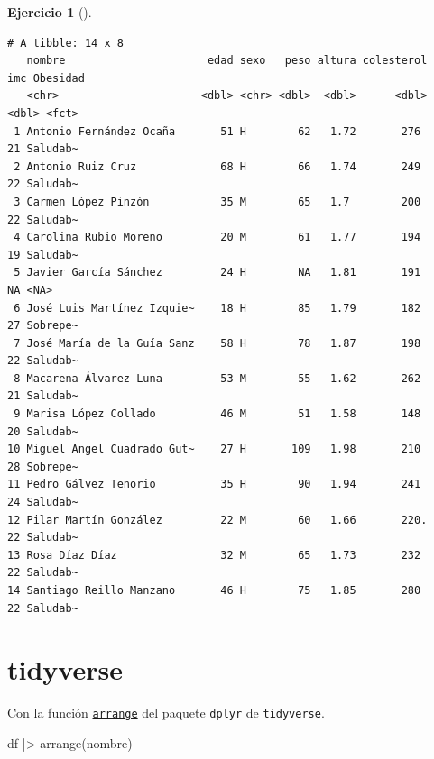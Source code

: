 \documentclass[
  spanish,
  a4paper,
]{scrreport}
\newenvironment{Shaded}{\begin{snugshade}}{\end{snugshade}}
\newcommand{\FunctionTok}[1]{\textcolor[rgb]{0.28,0.35,0.67}{#1}}
\newcommand{\NormalTok}[1]{\textcolor[rgb]{0.00,0.23,0.31}{#1}}
\newcommand{\SpecialCharTok}[1]{\textcolor[rgb]{0.37,0.37,0.37}{#1}}
\theoremstyle{definition}
\newtheorem{exercise}{Ejercicio}[chapter]
\theoremstyle{remark}
\begin{document}
\begin{exercise}[]
\begin{enumerate}
\begin{tcolorbox}
\begin{Shaded}
\end{Shaded}

\begin{verbatim}
# A tibble: 14 x 8
   nombre                      edad sexo   peso altura colesterol   imc Obesidad
   <chr>                      <dbl> <chr> <dbl>  <dbl>      <dbl> <dbl> <fct>   
 1 Antonio Fernández Ocaña       51 H        62   1.72       276     21 Saludab~
 2 Antonio Ruiz Cruz             68 H        66   1.74       249     22 Saludab~
 3 Carmen López Pinzón           35 M        65   1.7        200     22 Saludab~
 4 Carolina Rubio Moreno         20 M        61   1.77       194     19 Saludab~
 5 Javier García Sánchez         24 H        NA   1.81       191     NA <NA>    
 6 José Luis Martínez Izquie~    18 H        85   1.79       182     27 Sobrepe~
 7 José María de la Guía Sanz    58 H        78   1.87       198     22 Saludab~
 8 Macarena Álvarez Luna         53 M        55   1.62       262     21 Saludab~
 9 Marisa López Collado          46 M        51   1.58       148     20 Saludab~
10 Miguel Angel Cuadrado Gut~    27 H       109   1.98       210     28 Sobrepe~
11 Pedro Gálvez Tenorio          35 H        90   1.94       241     24 Saludab~
12 Pilar Martín González         22 M        60   1.66       220.    22 Saludab~
13 Rosa Díaz Díaz                32 M        65   1.73       232     22 Saludab~
14 Santiago Reillo Manzano       46 H        75   1.85       280     22 Saludab~
\end{verbatim}

  \section{tidyverse}

  Con la función
  \href{https://dplyr.tidyverse.org/reference/arrange.html}{\texttt{arrange}}
  del paquete \texttt{dplyr} de \texttt{tidyverse}.

\begin{Shaded}
\begin{Highlighting}[]
\NormalTok{df }\SpecialCharTok{|\textgreater{}} \FunctionTok{arrange}\NormalTok{(nombre)}
\end{Highlighting}
\end{Shaded}


\end{tcolorbox}
\end{enumerate}
\end{exercise}
\end{document}
